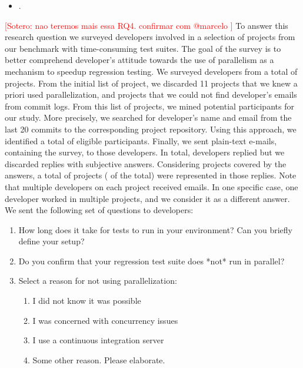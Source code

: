 \documentclass[10pt,journal,compsoc]{IEEEtran}
\begin{document}
\begin{itemize}
  \item \numRQAdoptionTwo{}. \textbf{\RQAdoptionTwo{}}
\end{itemize}

\textcolor{red}{[Sotero: nao teremos mais essa RQ4. confirmar com @marcelo ]} To answer this research question we surveyed developers involved in a
selection of projects from our benchmark with time-consuming test
suites.  The goal of the survey is to better comprehend developer's
attitude towards the use of parallelism as a mechanism to speedup
regression testing.  We surveyed developers from a total of
\emailsProjects{} projects.  From the initial list of \numMedLong{}
project, we discarded 11 projects that we knew a priori used
parallelization, and \discartedProjects{} projects that we could not find
developer's emails from commit logs.  From this list of projects, we
mined potential participants for our study.  More precisely, we
searched for developer's name and email from the last 20 commits to
the corresponding project repository.  Using this approach, we
identified a total of \emailsSent{} eligible participants.  Finally,
we sent plain-text e-mails, containing the survey, to those developers.  In
total, \emailsAnswered{} developers replied but we discarded
\emailsFalseAnswers{} replies with subjective answers.  Considering
projects covered by the answers, a total of \emailsProjectsAnswered{}
projects (\percEmailsProjectsAnswered{} of the total) were represented
in those replies. Note that multiple developers on each project
received emails. In one specific case, one developer worked in
  multiple projects, and we consider it as a different answer. We sent the following set of questions to
developers:

\begin{enumerate}
\item How long does it take for tests to run in your environment? Can
  you briefly define your setup?
\item Do you confirm that your regression test suite does *not* run in parallel?
\item\label{questionThree} Select a reason for not using parallelization:
  \begin{enumerate}[label=\alph*)]
  \item I did not know it was possible
  \item I was concerned with concurrency issues
  \item I use a continuous integration server
  \item Some other reason. Please elaborate.
  \end{enumerate}
\end{enumerate}
\end{document}
